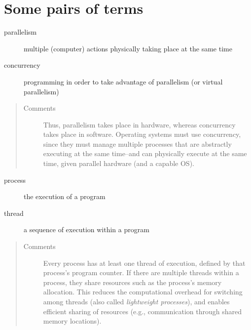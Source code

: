 \documentclass[letterpaper,10pt,openany,oneside]{sphinxmanual}
\begin{document}
\section{Some pairs of terms}
\label{Introduction/Introduction:moore-s-law}\label{Introduction/Introduction:some-pairs-of-terms}\begin{description}
\item[{parallelism}] \leavevmode{}\label{Introduction/Introduction:term-parallelism}
multiple (computer) actions physically taking place at the same time

\end{description}
\begin{description}
\item[{concurrency}] \leavevmode{}\label{Introduction/Introduction:term-concurrency}
programming in order to take advantage of parallelism (or virtual parallelism)

\end{description}
\begin{quote}\begin{description}
\item[{Comments}] \leavevmode
Thus, parallelism takes place in hardware, whereas concurrency takes place in software. Operating systems must use concurrency, since they must manage multiple processes that are abstractly executing at the same time--and can physically execute at the same time, given parallel hardware (and a capable OS).

\end{description}\end{quote}
\begin{description}
\item[{process}] \leavevmode{}\label{Introduction/Introduction:term-process}
the execution of a program

\end{description}
\begin{description}
\item[{thread}] \leavevmode{}\label{Introduction/Introduction:term-thread}
a sequence of execution within a program

\end{description}
\begin{quote}\begin{description}
\item[{Comments}] \leavevmode
Every process has at least one thread of execution, defined by that process's program counter. If there are multiple threads within a process, they share resources such as the process's memory allocation. This reduces the computational overhead for switching among threads (also called \emph{lightweight processes}), and enables efficient sharing of resources (e.g., communication through shared memory locations).

\end{description}\end{quote}
\end{document}
